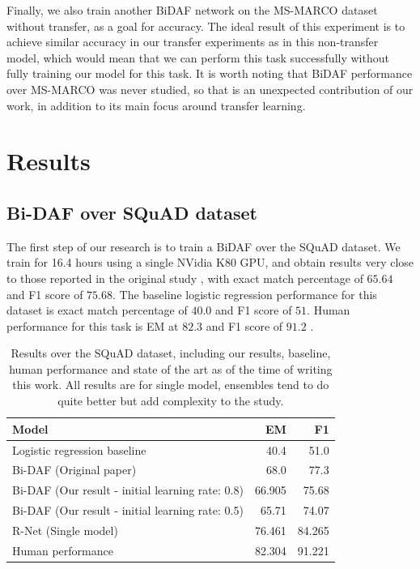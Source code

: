 \documentclass[11pt,a4paper]{article}
\begin{document}
Finally, we also train another BiDAF network on the MS-MARCO dataset without transfer, as a goal for accuracy. The ideal result of this experiment is to achieve similar accuracy in our transfer experiments as in this non-transfer model, which would mean that we can perform this task successfully without fully training our model for this task. It is worth noting that BiDAF performance over MS-MARCO was never studied, so that is an unexpected contribution of our work, in addition to its main focus around transfer learning.

\section{Results}
\label{sec:results}

\subsection{Bi-DAF over SQuAD dataset}

The first step of our research is to train a BiDAF over the SQuAD dataset. We train for 16.4 hours using a single NVidia K80 GPU, and obtain results very close to those reported in the original study \cite{bidaf:2017}, with exact match percentage of $65.64$ and F1 score of $75.68$. The baseline logistic regression performance for this dataset is exact match percentage of $40.0$ and F1 score of $51$. Human performance for this task is EM at $82.3$ and F1 score of $91.2$ \cite{squad:2016} \cite{rnet}.

\begin{table}[t!]
\begin{center}
\begin{tabular}{|l|r|r|}
\hline \bf Model & \bf EM & \bf F1 \\ \hline
Logistic regression baseline  \cite{squad:2016} & 40.4 & 51.0 \\
Bi-DAF (Original paper) & 68.0 & 77.3 \\
Bi-DAF (Our result - initial learning rate: 0.8) & 66.905 &  75.68 \\
Bi-DAF (Our result - initial learning rate: 0.5) & 65.71 & 74.07\\
R-Net (Single model) & 76.461 & 84.265 \\
Human performance \cite{squad:2016} & 82.304 & 91.221 \\
\end{tabular}
\end{center}
\caption{\label{squad-table} Results over the SQuAD dataset, including our results, baseline, human performance and state of the art as of the time of writing this work. All results are for single model, ensembles tend to do quite better but add complexity to the study.}
\end{table}
\end{document}

